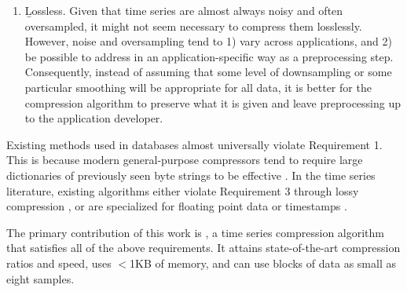 \begin{enumerate}
\item \b{Lossless}. Given that time series are almost always noisy and often oversampled, it might not seem necessary to compress them losslessly. However, noise and oversampling tend to 1) vary across applications, and 2) be possible to address in an application-specific way as a preprocessing step. Consequently, instead of assuming that some level of downsampling or some particular smoothing will be appropriate for all data, it is better for the compression algorithm to preserve what it is given and leave preprocessing up to the application developer.
\end{enumerate}

Existing methods used in databases almost universally violate Requirement 1. This is because modern general-purpose compressors tend to require large dictionaries of previously seen byte strings to be effective \cite{lz4, snappy, gzip, zlib}. In the time series literature, existing algorithms either violate Requirement 3 through lossy compression \cite{SAX, tsCompressSmartGrid, ecgCompressLossy, apca, lemireSegmentation}, or are specialized for floating point data \cite{gorilla} or timestamps \cite{gorilla, berkeleyTreeDB, FastPFOR}.

The primary contribution of this work is \mine,
a time series compression algorithm that satisfies all of the above requirements. It attains state-of-the-art compression ratios and speed, uses $<$1KB of memory, and can use blocks of data as small as eight samples.

